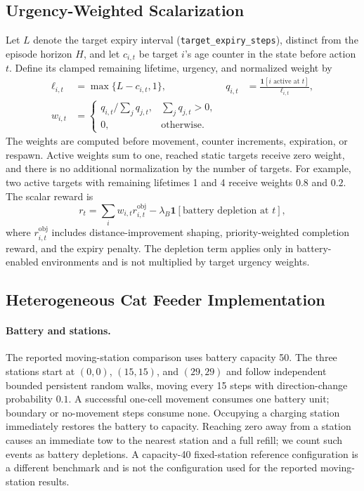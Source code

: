 \subsection{Urgency-Weighted Scalarization}
\label{app:urgency-scalarization}
Let $L$ denote the target expiry interval (\texttt{target\_expiry\_steps}), distinct from the episode horizon $H$, and let $c_{i,t}$ be target $i$'s age counter in the state before action $t$.
Define its clamped remaining lifetime, urgency, and normalized weight by
\begin{align}
  \ell_{i,t} &= \max\{L-c_{i,t},1\}, &
  q_{i,t} &= \frac{\mathbf{1}[i\text{ active at }t]}{\ell_{i,t}}, \\
  w_{i,t} &=
  \begin{cases}
    q_{i,t}/\sum_j q_{j,t}, & \sum_j q_{j,t}>0,\\
    0, & \text{otherwise}.
  \end{cases}
\end{align}
The weights are computed before movement, counter increments, expiration, or respawn.
Active weights sum to one, reached static targets receive zero weight, and there is no additional normalization by the number of targets.
For example, two active targets with remaining lifetimes 1 and 4 receive weights $0.8$ and $0.2$.
The scalar reward is
\begin{equation}
  r_t = \sum_i w_{i,t} r^{\mathrm{obj}}_{i,t}
        -\lambda_B\mathbf{1}[\text{battery depletion at }t],
\end{equation}
where $r^{\mathrm{obj}}_{i,t}$ includes distance-improvement shaping, priority-weighted completion reward, and the expiry penalty.
The depletion term applies only in battery-enabled environments and is not multiplied by target urgency weights.

\subsection{Heterogeneous Cat Feeder Implementation}
\label{app:heterogeneous-implementation}
\paragraph{Battery and stations.}
The reported moving-station comparison uses battery capacity 50.
The three stations start at $(0,0)$, $(15,15)$, and $(29,29)$ and follow independent bounded persistent random walks, moving every 15 steps with direction-change probability $0.1$.
A successful one-cell movement consumes one battery unit; boundary or no-movement steps consume none.
Occupying a charging station immediately restores the battery to capacity.
Reaching zero away from a station causes an immediate tow to the nearest station and a full refill; we count such events as battery depletions.
A capacity-40 fixed-station reference configuration is a different benchmark and is not the configuration used for the reported moving-station results.

